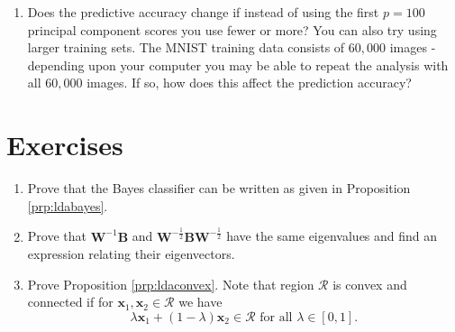 \documentclass[
]{book}
\newenvironment{Shaded}{\begin{snugshade}}{\end{snugshade}}
\newcommand{\FunctionTok}[1]{\textcolor[rgb]{0.13,0.29,0.53}{\textbf{#1}}}
\newcommand{\NormalTok}[1]{#1}
\newcommand{\OtherTok}[1]{\textcolor[rgb]{0.56,0.35,0.01}{#1}}
\newcommand{\SpecialCharTok}[1]{\textcolor[rgb]{0.81,0.36,0.00}{\textbf{#1}}}
\providecommand{\tightlist}{%
  \setlength{\itemsep}{0pt}\setlength{\parskip}{0pt}}
\theoremstyle{definition}
\theoremstyle{definition}
\theoremstyle{definition}
\theoremstyle{definition}
\theoremstyle{remark}
\begin{document}
\begin{Shaded}
\end{Shaded}

\begin{enumerate}
\def\labelenumi{\alph{enumi}.}
\setcounter{enumi}{21}
\tightlist
\item
  Does the predictive accuracy change if instead of using the first \(p=100\) principal component scores you use fewer or more? You can also try using larger training sets. The MNIST training data consists of \(60,000\) images - depending upon your computer you may be able to repeat the analysis with all \(60,000\) images. If so, how does this affect the prediction accuracy?
\end{enumerate}

\hypertarget{exercises-5}{%
\section{Exercises}\label{exercises-5}}

\begin{enumerate}
\def\labelenumi{\arabic{enumi}.}
\item
  Prove that the Bayes classifier can be written as given in Proposition \ref{prp:ldabayes}.
\item
  Prove that \(\mathbf W^{-1}\mathbf B\) and \(\mathbf W^{-\frac{1}{2}}\mathbf B\mathbf W^{-\frac{1}{2}}\) have the same eigenvalues and find an expression relating their eigenvectors.
\item
  Prove Proposition \ref{prp:ldaconvex}. Note that region \(\mathcal{R}\) is convex and connected if for \(\mathbf x_1, \mathbf x_2 \in \mathcal{R}\) we have
  \[\lambda \mathbf x_1+(1-\lambda) \mathbf x_2 \in \mathcal{R} \mbox{ for all } \lambda \in [0,1].\]
\end{enumerate}
\end{document}
